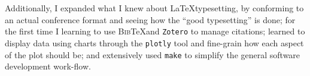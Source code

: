 \documentclass[letterpaper,twocolumn,10pt]{article}
\begin{document}
Additionally, I expanded what I knew about \LaTeX typesetting, by conforming to an actual conference format and seeing how the ``good typesetting'' is done; for the first time I learning to use \textsc{Bib}\negthinspace\TeX and \texttt{Zotero} to manage citations; learned to display data using charts through the \texttt{plotly} tool and fine-grain how each aspect of the plot should be; and extensively used \texttt{make} to simplify the general software development work-flow.

{\footnotesize 
}

\theendnotes
\end{document}

